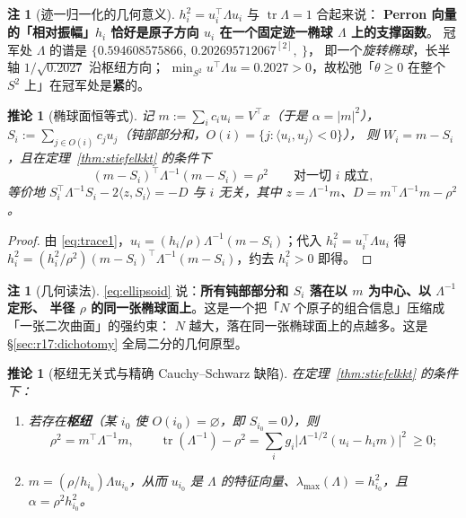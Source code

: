 \documentclass[UTF8,11pt]{ctexart}
\newtheorem{corollary}[theorem]{推论}
\theoremstyle{definition}
\newtheorem{remark}[theorem]{注}
\newcommand{\Lam}{\Lambda}
\newcommand{\tr}{\operatorname{tr}}
\begin{document}
\begin{remark}[迹一归一化的几何意义]\label{rmk:trace1}
$h_i^2=u_i^\top\!\Lam u_i$ 与 $\tr\Lam=1$ 合起来说：
\textbf{Perron 向量的「相对振幅」$h_i$ 恰好是原子方向 $u_i$ 在一个固定迹一椭球 $\Lam$ 上的支撑函数}。
冠军处 $\Lam$ 的谱是 $\{0.594608575866,\ 0.202695712067^{[2]},\ \}$，
即一个\emph{旋转椭球}，长半轴 $1/\sqrt{0.2027}$ 沿枢纽方向；
$\min_{S^2}u^\top\!\Lam u=0.2027>0$，故松弛「$\theta\ge0$ 在整个 $S^2$ 上」在冠军处是\textbf{紧}的。
\end{remark}

\begin{corollary}[椭球面恒等式]\label{cor:ellipsoid}
记 $m:=\sum_ic_iu_i=V^\top x$（于是 $\alpha=|m|^2$），
$S_i:=\sum_{j\in O(i)}c_ju_j$（钝部部分和，$O(i)=\{j:\langle u_i,u_j\rangle<0\}$），
则 $W_i=m-S_i$，且在定理~\ref{thm:stiefelkkt} 的条件下
\begin{equation}\label{eq:ellipsoid}
(m-S_i)^\top\Lam^{-1}(m-S_i)=\rho^2\qquad\text{对一切 }i\text{ 成立},
\end{equation}
等价地 $S_i^\top\Lam^{-1}S_i-2\langle z,S_i\rangle=-D$ 与 $i$ 无关，其中 $z=\Lam^{-1}m$、$D=m^\top\Lam^{-1}m-\rho^2$。
\end{corollary}

\begin{proof}
由 \eqref{eq:trace1}，$u_i=(h_i/\rho)\Lam^{-1}(m-S_i)$；代入 $h_i^2=u_i^\top\!\Lam u_i$ 得
$h_i^2=(h_i^2/\rho^2)(m-S_i)^\top\Lam^{-1}(m-S_i)$，约去 $h_i^2>0$ 即得。
\end{proof}

\begin{remark}[几何读法]\label{rmk:ellipsoidread}
\eqref{eq:ellipsoid} 说：\textbf{所有钝部部分和 $S_i$ 落在以 $m$ 为中心、以 $\Lam^{-1}$ 定形、
半径 $\rho$ 的同一张椭球面上}。这是一个把「$N$ 个原子的组合信息」压缩成「一张二次曲面」的强约束：
$N$ 越大，落在同一张椭球面上的点越多。这是 \S\ref{sec:r17:dichotomy} 全局二分的几何原型。
\end{remark}

\begin{corollary}[枢纽无关式与精确 Cauchy--Schwarz 缺陷]\label{cor:hubfree}
在定理~\ref{thm:stiefelkkt} 的条件下：
\begin{enumerate}\itemsep1pt
\item 若存在\textbf{枢纽}（某 $i_0$ 使 $O(i_0)=\varnothing$，即 $S_{i_0}=0$），则
\begin{equation}\label{eq:hubfree}
\rho^2=m^\top\Lam^{-1}m,\qquad
\tr(\Lam^{-1})-\rho^2=\sum_ig_i\bigl|\Lam^{-1/2}(u_i-h_im)\bigr|^2\ \ge0 ;
\end{equation}
\item $m=(\rho/h_{i_0})\Lam u_{i_0}$，从而 $u_{i_0}$ 是 $\Lam$ 的特征向量、$\lambda_{\max}(\Lam)=h_{i_0}^2$，且
$\alpha=\rho^2h_{i_0}^2$。
\end{enumerate}
\end{corollary}
\end{document}
